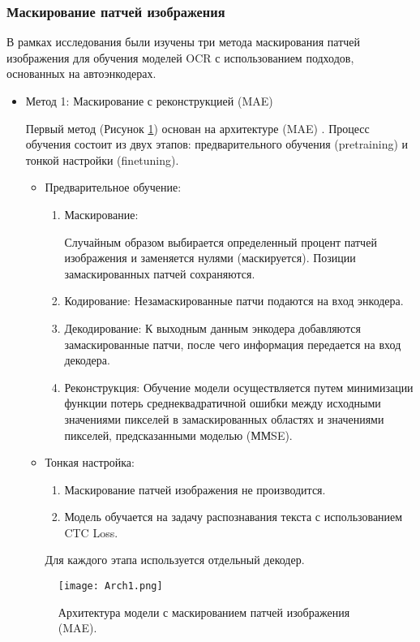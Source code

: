 \subsubsection{Маскирование патчей изображения}
В рамках исследования были изучены три метода маскирования патчей изображения для обучения моделей OCR с использованием подходов, основанных на автоэнкодерах. 
\begin{itemize}
   \item Метод 1: Маскирование с реконструкцией (MAE)
   
     Первый метод (Рисунок \ref{3}) основан на архитектуре (MAE) \cite{he2021masked}. Процесс обучения состоит из двух этапов: предварительного обучения (pretraining) и тонкой настройки (finetuning).
     \begin{itemize}
        \item Предварительное обучение:
        \begin{enumerate}
          \item Маскирование:
          
          Случайным образом выбирается определенный процент патчей изображения и заменяется нулями (маскируется). Позиции замаскированных патчей сохраняются.
          \item Кодирование: Незамаскированные патчи подаются на вход энкодера.
          \item Декодирование: К выходным данным энкодера добавляются замаскированные патчи, после чего информация передается на вход декодера.
          \item Реконструкция: Обучение модели осуществляется путем минимизации функции потерь среднеквадратичной ошибки между исходными значениями пикселей в замаскированных областях и значениями пикселей, предсказанными моделью (ММSE).
        \end{enumerate}
        \item Тонкая настройка:
        \begin{enumerate}
          \item Маскирование патчей изображения не производится.
          \item Модель обучается на задачу распознавания текста с использованием CTC Loss.
        \end{enumerate}

        Для каждого этапа используется отдельный декодер.

     \end{itemize}
     \begin{figure}[H]
        \centering
        \texttt{[image: Arch1.png]}
        \caption{Архитектура модели с маскированием патчей изображения (MAE).}
        \label{3} 
     \end{figure}


\end{itemize}
